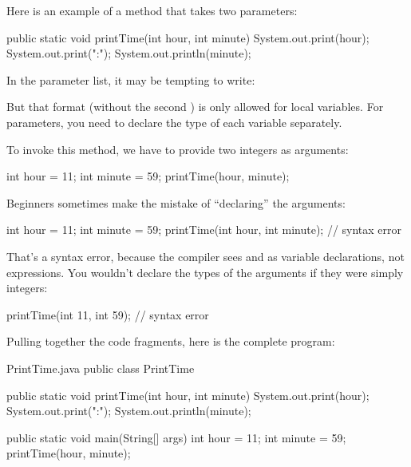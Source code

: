 

Here is an example of a method that takes two parameters:

\begin{code}
public static void printTime(int hour, int minute) {
    System.out.print(hour);
    System.out.print(":");
    System.out.println(minute);
}
\end{code}

In the parameter list, it may be tempting to write:

\begin{code}
public static void printTime(int hour, minute) {  // error
\end{code}

But that format (without the second ) is only allowed for local variables.
For parameters, you need to declare the type of each variable separately.

To invoke this method, we have to provide two integers as arguments:

\begin{code}
int hour = 11;
int minute = 59;
printTime(hour, minute);
\end{code}

Beginners sometimes make the mistake of ``declaring'' the arguments:

\begin{code}
int hour = 11;
int minute = 59;
printTime(int hour, int minute);  // syntax error
\end{code}

That's a syntax error, because the compiler sees  and  as variable declarations, not expressions.
You wouldn't declare the types of the arguments if they were simply integers:

\begin{code}
printTime(int 11, int 59);  // syntax error
\end{code}

Pulling together the code fragments, here is the complete program:

\begin{trinket}[340]{PrintTime.java}
public class PrintTime {

    public static void printTime(int hour, int minute) {
        System.out.print(hour);
        System.out.print(":");
        System.out.println(minute);
    }

    public static void main(String[] args) {
        int hour = 11;
        int minute = 59;
        printTime(hour, minute);
    }
}
\end{trinket}


